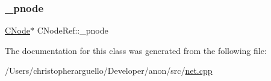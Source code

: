 \subsubsection{\texorpdfstring{\+\_\+pnode}{\_pnode}}
{\footnotesize\ttfamily \mbox{\hyperlink{class_c_node}{C\+Node}}$\ast$ C\+Node\+Ref\+::\+\_\+pnode\hspace{0.3cm}{\ttfamily [private]}}



The documentation for this class was generated from the following file\+:\begin{DoxyCompactItemize}
\item 
/\+Users/christopherarguello/\+Developer/anon/src/\mbox{\hyperlink{net_8cpp}{net.\+cpp}}\end{DoxyCompactItemize}
